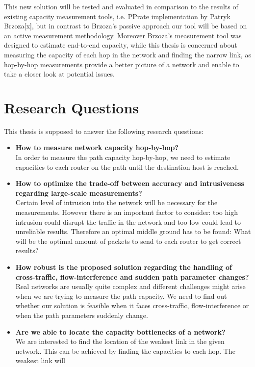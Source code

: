 This new solution will be tested and evaluated in comparison to the results of existing capacity measurement tools, i.e. PPrate implementation by Patryk Brzoza[x], but in contrast to Brzoza’s passive approach our tool will be based on an active measurement methodology. Moreover Brzoza’s measurement tool was designed to estimate end-to-end capacity, while this thesis is concerned about measuring the capacity of each hop in the network and finding the narrow link, as hop-by-hop measurements provide a better picture of a network and enable to take a closer look at potential issues.



\section{Research Questions}
This thesis is supposed to answer the following research questions:

\begin{itemize}
  \item \textbf{How to measure network capacity hop-by-hop?}
  \\In order to measure the path capacity hop-by-hop, we need to estimate capacities to each router on the path until the destination host is reached. 
  \item \textbf{How to optimize the trade-off between accuracy and intrusiveness regarding large-scale measurements?}
  \\Certain level of intrusion into the network will be necessary for the measurements. However there is an important factor to consider: too high intrusion could disrupt the traffic in the network and too low could lead to unreliable results. Therefore an optimal middle ground has to be found: What will be the optimal amount of packets to send to each router to get correct results?
  \item \textbf{How robust is the proposed solution regarding the handling of cross-traffic, flow-interference and sudden path parameter changes?}
  \\Real networks are usually quite complex and different challenges might arise when we are trying to measure the path capacity. We need to find out whether our solution is feasible when it faces cross-traffic, flow-interference or when the path parameters suddenly change.
  \item \textbf{Are we able to locate the capacity bottlenecks of a network?}
  \\ We are interested to find the location of the weakest link in the given network. This can be achieved by finding the capacities to each hop. The weakest link will 
\end{itemize}


